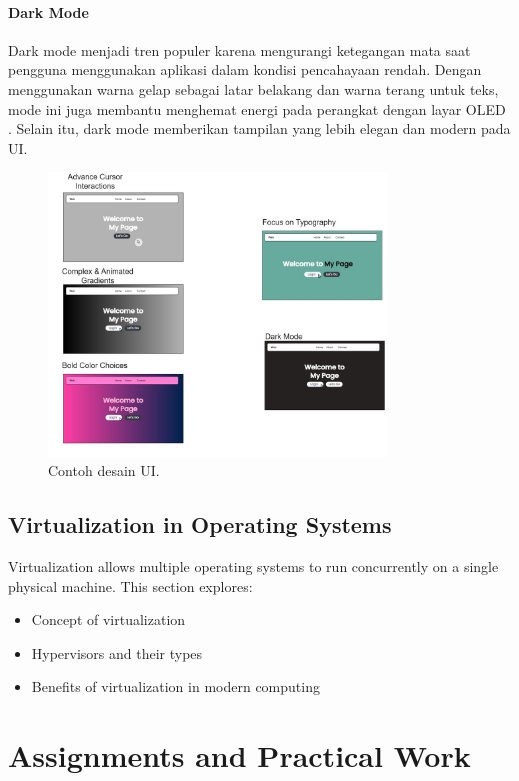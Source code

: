 \documentclass[12pt]{article}
\begin{document}
\paragraph{Dark Mode}
Dark mode menjadi tren populer karena mengurangi ketegangan mata saat pengguna menggunakan aplikasi dalam kondisi pencahayaan rendah. Dengan menggunakan warna gelap sebagai latar belakang dan warna terang untuk teks, mode ini juga membantu menghemat energi pada perangkat dengan layar OLED \cite{ricker2021}. Selain itu, dark mode memberikan tampilan yang lebih elegan dan modern pada UI.
\begin{figure}[h]
    \centering
    \includegraphics[width=0.8\textwidth]{asset/ContohUI.drawio (1).jpg}
    \caption{Contoh desain UI.}
    \label{fig:contoh_ui}
\end{figure}

\subsection{Virtualization in Operating Systems}
Virtualization allows multiple operating systems to run concurrently on a single physical machine. This section explores:
\begin{itemize}
    \item Concept of virtualization
    \item Hypervisors and their types
    \item Benefits of virtualization in modern computing
\end{itemize}

\section{Assignments and Practical Work}
\end{document}

